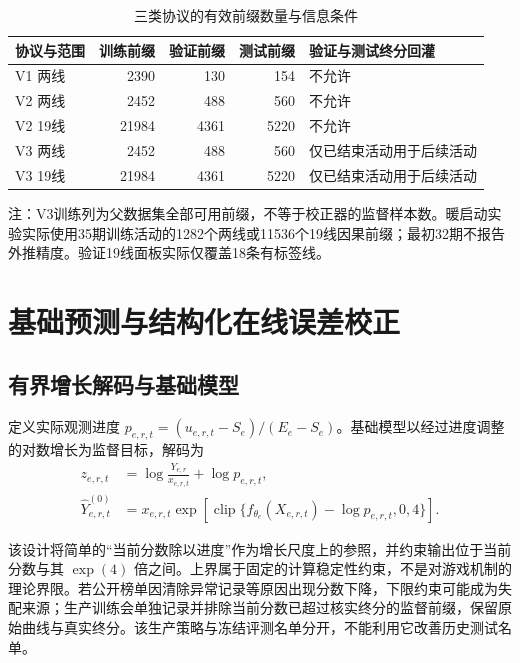 \documentclass[a4paper,11pt,fontset=none]{ctexart}
\begin{document}
\begin{table}[!htbp]
\centering
\caption{三类协议的有效前缀数量与信息条件}\label{tab:protocols}
\small
\setlength{\tabcolsep}{4pt}
\renewcommand{\arraystretch}{1.18}
\begin{tabularx}{\linewidth}{L r r r L}
\toprule
协议与范围 & 训练前缀 & 验证前缀 & 测试前缀 & 验证与测试终分回灌 \\
\midrule
V1 两线 & 2390 & 130 & 154 & 不允许 \\
V2 两线 & 2452 & 488 & 560 & 不允许 \\
V2 19线 & 21984 & 4361 & 5220 & 不允许 \\
V3 两线 & 2452 & 488 & 560 & 仅已结束活动用于后续活动 \\
V3 19线 & 21984 & 4361 & 5220 & 仅已结束活动用于后续活动 \\
\bottomrule
\end{tabularx}
\par\vspace{4pt}
\begin{minipage}{\linewidth}\footnotesize{}
注：V3训练列为父数据集全部可用前缀，不等于校正器的监督样本数。暖启动实验实际使用35期训练活动的1282个两线或11536个19线因果前缀；最初32期不报告外推精度。验证19线面板实际仅覆盖18条有标签线。
\end{minipage}
\end{table}

\section{基础预测与结构化在线误差校正}

\subsection{有界增长解码与基础模型}

定义实际观测进度 \(p_{e,r,t}=(u_{e,r,t}-S_e)/(E_e-S_e)\)。基础模型以经过进度调整的对数增长为监督目标，解码为
\begin{equation}\label{eq:target}
\begin{aligned}
z_{e,r,t}&=\log\frac{Y_{e,r}}{x_{e,r,t}}+\log p_{e,r,t},\\
\widehat Y^{(0)}_{e,r,t}&=x_{e,r,t}\exp\!\left[\operatorname{clip}\{f_{\theta_e}(X_{e,r,t})-\log p_{e,r,t},0,4\}\right].
\end{aligned}
\end{equation}

该设计将简单的``当前分数除以进度''作为增长尺度上的参照，并约束输出位于当前分数与其 \(\exp(4)\) 倍之间。上界属于固定的计算稳定性约束，不是对游戏机制的理论界限。若公开榜单因清除异常记录等原因出现分数下降，下限约束可能成为失配来源；生产训练会单独记录并排除当前分数已超过核实终分的监督前缀，保留原始曲线与真实终分。该生产策略与冻结评测名单分开，不能利用它改善历史测试名单。
\end{document}
